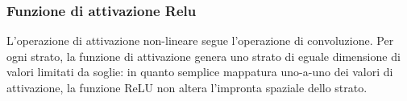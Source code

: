 \documentclass[14pt]{extarticle}
\begin{document}

\subsubsection{Funzione di attivazione Relu}
L’operazione di attivazione non-lineare segue l’operazione di convoluzione. Per ogni
strato, la funzione di attivazione genera uno strato di eguale dimensione
di valori limitati da soglie: in quanto semplice mappatura uno-a-uno dei
valori di attivazione, la funzione ReLU non altera l'impronta spaziale dello strato.

\end{document}
